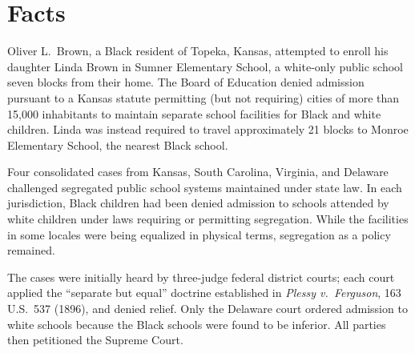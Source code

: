 \section{Facts}

Oliver L.\ Brown, a Black resident of Topeka, Kansas, attempted to enroll his daughter
Linda Brown in Sumner Elementary School, a white-only public school seven blocks from their
home.  The Board of Education denied admission pursuant to a Kansas statute permitting
(but not requiring) cities of more than 15{,}000 inhabitants to maintain separate school
facilities for Black and white children.  Linda was instead required to travel approximately
21 blocks to Monroe Elementary School, the nearest Black school.

Four consolidated cases from Kansas, South Carolina, Virginia, and Delaware challenged
segregated public school systems maintained under state law.  In each jurisdiction,
Black children had been denied admission to schools attended by white children under
laws requiring or permitting segregation.  While the facilities in some locales were
being equalized in physical terms, segregation as a policy remained.

The cases were initially heard by three-judge federal district courts; each court applied
the ``separate but equal'' doctrine established in \textit{Plessy v.\ Ferguson},
163 U.S.\ 537 (1896), and denied relief.  Only the Delaware court ordered admission to
white schools because the Black schools were found to be inferior.  All parties then
petitioned the Supreme Court.

